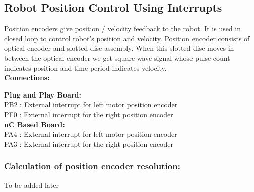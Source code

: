 \documentclass[a4paper,10pt,oneside]{article}
\begin{document}
		\subsection{\huge \textbf{Robot Position Control Using Interrupts}}
			{Position encoders give position / velocity feedback to the robot. It is used in closed loop to control robot’s position and velocity.  Position encoder consists of optical  encoder and slotted disc assembly. When this slotted disc moves in between the optical encoder we get square wave signal whose pulse  count  indicates  position  and  time  period indicates  velocity.}\\
			
			\textbf{Connections:\\}
			\begin{center}
				
				\textbf{Plug and Play Board:}\\
				PB2 : External interrupt for left motor position encoder\\
				PF0 : External interrupt for the right position encoder\\
			
				\textbf{uC Based Board:}\\
				PA4 : External interrupt for left motor position encoder\\
				PA3 : External interrupt for the right position encoder\\
			\end{center}
			\subsubsection{\textbf{Calculation of position encoder resolution:}}	
			To be added later
			
\end{document}

